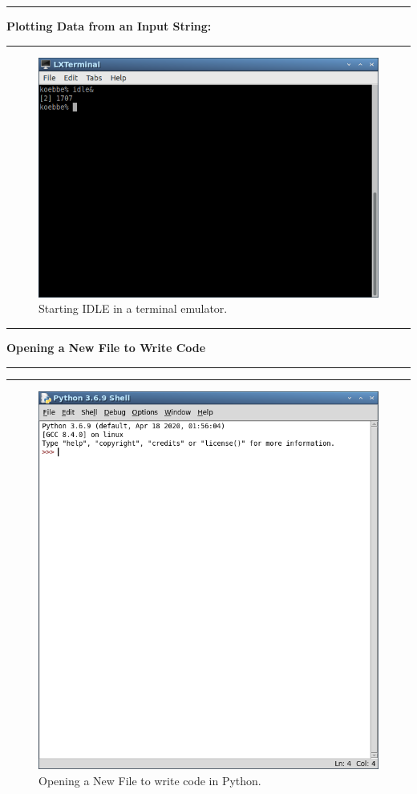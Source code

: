 \documentclass[10pt,fleqn]{article}
\begin{document}
\vskip0.1in\hrule\vskip0.1in\noindent
{\bf Plotting Data from an Input String:} 
\vskip0.1in\hrule\vskip0.1in\noindent
\vfill
\begin{figure}[h]
\centering
\includegraphics[width=6.0in]{../images/2dplot_02.png}
\vskip0.1in
\caption{Starting IDLE in a terminal emulator.}
\end{figure}
\eject
\vskip0.1in\hrule\vskip0.1in
\noindent
{\bf Opening a New File to Write Code} 
\vskip0.1in\hrule\vskip0.1in
\noindent
\vskip0.1in\hrule\vskip0.1in
\vfill
\begin{figure}[h]
\centering
\includegraphics[width=6.0in]{../images/2dplot_03.png}
\caption{Opening a New File to write code in Python.}
\end{figure}
\end{document}
